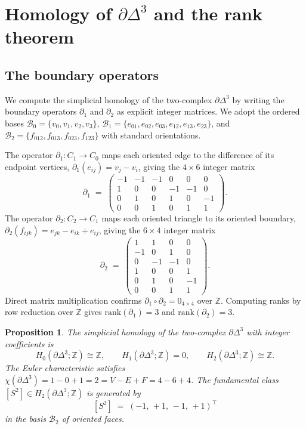 \documentclass[11pt,a4paper]{article}
\newtheorem{proposition}[theorem]{Proposition}
\theoremstyle{definition}
\newcommand{\Sfour}{\partial\Delta^3}
\newcommand{\Hk}[1]{H_{#1}}
\newcommand{\rank}{\mathrm{rank}}
\begin{document}
\section{Homology of \texorpdfstring{$\partial\Delta^3$}{∂Δ³} and the rank theorem}
\label{sec:homology}

\subsection{The boundary operators}
\label{subsec:boundary}

We compute the simplicial homology of the two-complex $\Sfour$ by writing the boundary operators $\partial_1$ and $\partial_2$ as explicit integer matrices. We adopt the ordered bases $\mathcal{B}_0 = \{v_0, v_1, v_2, v_3\}$, $\mathcal{B}_1 = \{e_{01}, e_{02}, e_{03}, e_{12}, e_{13}, e_{23}\}$, and $\mathcal{B}_2 = \{f_{012}, f_{013}, f_{023}, f_{123}\}$ with standard orientations.

The operator $\partial_1 : C_1 \to C_0$ maps each oriented edge to the difference of its endpoint vertices, $\partial_1(e_{ij}) = v_j - v_i$, giving the $4 \times 6$ integer matrix
\[
  \partial_1 \;=\;
  \begin{pmatrix}
    -1 & -1 & -1 &  0 &  0 &  0 \\
     1 &  0 &  0 & -1 & -1 &  0 \\
     0 &  1 &  0 &  1 &  0 & -1 \\
     0 &  0 &  1 &  0 &  1 &  1
  \end{pmatrix}.
\]
The operator $\partial_2 : C_2 \to C_1$ maps each oriented triangle to its oriented boundary, $\partial_2(f_{ijk}) = e_{jk} - e_{ik} + e_{ij}$, giving the $6 \times 4$ integer matrix
\[
  \partial_2 \;=\;
  \begin{pmatrix}
     1 &  1 &  0 &  0 \\
    -1 &  0 &  1 &  0 \\
     0 & -1 & -1 &  0 \\
     1 &  0 &  0 &  1 \\
     0 &  1 &  0 & -1 \\
     0 &  0 &  1 &  1
  \end{pmatrix}.
\]
Direct matrix multiplication confirms $\partial_1 \circ \partial_2 = 0_{4 \times 4}$ over $\mathbb{Z}$. Computing ranks by row reduction over $\mathbb{Z}$ gives $\rank(\partial_1) = 3$ and $\rank(\partial_2) = 3$.

\begin{proposition}
  \label{prop:homology_S2}
  The simplicial homology of the two-complex $\Sfour$ with integer coefficients is
  \[
    \Hk{0}(\Sfour;\mathbb{Z}) \cong \mathbb{Z}, \qquad
    \Hk{1}(\Sfour;\mathbb{Z}) = 0, \qquad
    \Hk{2}(\Sfour;\mathbb{Z}) \cong \mathbb{Z}.
  \]
  The Euler characteristic satisfies $\chi(\Sfour) = 1 - 0 + 1 = 2 = V - E + F = 4 - 6 + 4$. The fundamental class $[S^2] \in \Hk{2}(\Sfour;\mathbb{Z})$ is generated by
  \[
    [S^2] \;=\; (-1,\, +1,\, -1,\, +1)^{\!\top}
  \]
  in the basis $\mathcal{B}_2$ of oriented faces.
\end{proposition}
\end{document}
